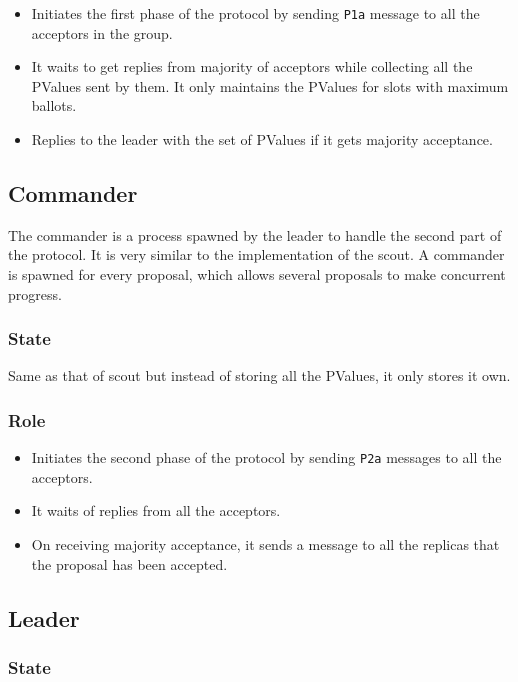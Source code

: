 \begin{itemize}
  \item Initiates the first phase of the protocol by sending \texttt{P1a}
    message to all the acceptors in the group.
  \item It waits to get replies from majority of acceptors while collecting
    all the PValues sent by them. It only maintains the PValues for slots
    with maximum ballots.
  \item Replies to the leader with the set of PValues if it gets majority
    acceptance.
\end{itemize}

\subsection{Commander}

The commander is a process spawned by the leader to handle the second part of 
the protocol. It is very similar to the implementation of the scout. A commander
is spawned for every proposal, which allows several proposals to make concurrent
progress.

\subsubsection{State}

Same as that of scout  but instead of storing all the
PValues, it only stores it own.

\subsubsection{Role}

\begin{itemize}
  \item Initiates the second phase of the protocol by sending \texttt{P2a}
    messages to all the acceptors.
  \item It waits of replies from all the acceptors.
  \item On receiving majority acceptance, it sends a message to all the replicas
    that the proposal has been accepted.
\end{itemize}

\subsection{Leader}


\subsubsection{State}


